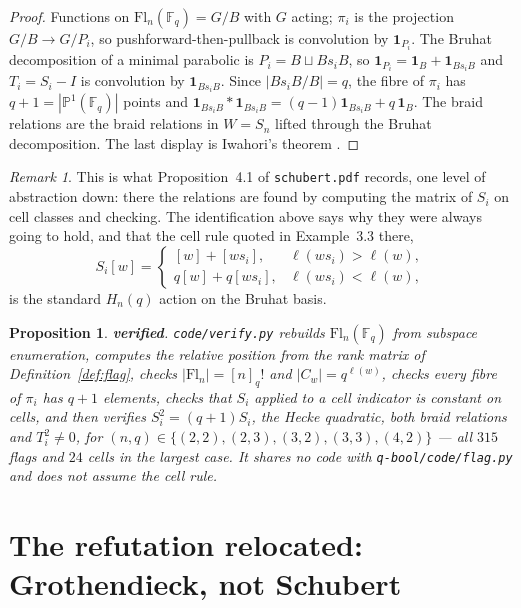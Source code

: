 \documentclass[11pt,a4paper]{article}
\newtheorem{proposition}[theorem]{Proposition}
\theoremstyle{definition}
\theoremstyle{remark}
\newtheorem{remark}[theorem]{Remark}
\newcommand{\FF}{\mathbb{F}}
\newcommand{\Fl}{\mathrm{Fl}}
\newcommand{\OK}{\textcolor{okgreen}{\textbf{verified}}}
\begin{document}
\begin{proof}
Functions on $\Fl_n(\FF_q) = G/B$ with $G$ acting; $\pi_i$ is the projection
$G/B \to G/P_i$, so pushforward-then-pullback is convolution by
$\mathbf{1}_{P_i}$. The Bruhat decomposition of a minimal parabolic is
$P_i = B \sqcup Bs_iB$, so $\mathbf{1}_{P_i} = \mathbf{1}_B +
\mathbf{1}_{Bs_iB}$ and $T_i = S_i - I$ is convolution by
$\mathbf{1}_{Bs_iB}$. Since $|Bs_iB/B| = q$, the fibre of $\pi_i$ has
$q + 1 = |\mathbb{P}^1(\FF_q)|$ points and
$\mathbf{1}_{Bs_iB} * \mathbf{1}_{Bs_iB} = (q-1)\mathbf{1}_{Bs_iB} +
q\,\mathbf{1}_B$. The braid relations are the braid relations in $W = S_n$
lifted through the Bruhat decomposition. The last display is Iwahori's theorem
\cite{Iwahori}.
\end{proof}

\begin{remark}
This is what Proposition~4.1 of \texttt{schubert.pdf} records, one level of
abstraction down: there the relations are found by computing the matrix of
$S_i$ on cell classes and checking. The identification above says why they were
always going to hold, and that the cell rule quoted in Example~3.3 there,
\[
  S_i[w] =
  \begin{cases} [w] + [ws_i], & \ell(ws_i) > \ell(w),\\
                q[w] + q[ws_i], & \ell(ws_i) < \ell(w), \end{cases}
\]
is the standard $H_n(q)$ action on the Bruhat basis.
\end{remark}

\begin{proposition}\label{prop:v1}
\OK. \texttt{code/verify.py} rebuilds $\Fl_n(\FF_q)$ from subspace enumeration,
computes the relative position from the rank matrix of
Definition~\ref{def:flag}, checks $|\Fl_n| = [n]_q!$ and $|C_w| = q^{\ell(w)}$,
checks every fibre of $\pi_i$ has $q+1$ elements, checks that $S_i$ applied to
a cell indicator is constant on cells, and then verifies
$S_i^2 = (q+1)S_i$, the Hecke quadratic, both braid relations and
$T_i^2 \neq 0$, for $(n,q) \in \{(2,2),(2,3),(3,2),(3,3),(4,2)\}$ --- all $315$
flags and $24$ cells in the largest case. It shares no code with
\texttt{q-bool/code/flag.py} and does not assume the cell rule.
\end{proposition}

\section{The refutation relocated: Grothendieck, not
Schubert}\label{sec:groth}
\end{document}
